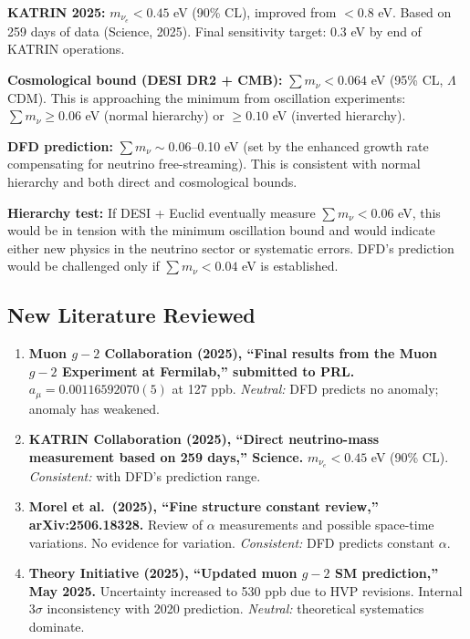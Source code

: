 \documentclass[11pt]{article}
\newcommand{\LCDM}{$\Lambda$CDM}
\begin{document}
\textbf{KATRIN 2025:} $m_{\nu_e} < 0.45$ eV (90\% CL), improved from
$< 0.8$ eV. Based on 259 days of data (Science, 2025). Final sensitivity
target: 0.3 eV by end of KATRIN operations.

\textbf{Cosmological bound (DESI DR2 + CMB):} $\sum m_\nu < 0.064$ eV
(95\% CL, \LCDM). This is approaching the minimum from oscillation
experiments: $\sum m_\nu \geq 0.06$ eV (normal hierarchy) or
$\geq 0.10$ eV (inverted hierarchy).

\textbf{DFD prediction:} $\sum m_\nu \sim 0.06$--0.10 eV (set by the
enhanced growth rate compensating for neutrino free-streaming). This
is consistent with normal hierarchy and both direct and cosmological
bounds.

\textbf{Hierarchy test:} If DESI + Euclid eventually measure
$\sum m_\nu < 0.06$ eV, this would be in tension with the minimum
oscillation bound and would indicate either new physics in the neutrino
sector or systematic errors. DFD's prediction would be challenged only
if $\sum m_\nu < 0.04$ eV is established.

\subsection{New Literature Reviewed}

\begin{tcolorbox}[colback=green!5!white, colframe=green!50!black,
  title=\textbf{Agent 13: NEW LITERATURE REVIEWED}]

\begin{enumerate}

\item \textbf{Muon $g-2$ Collaboration (2025), ``Final results from
  the Muon $g-2$ Experiment at Fermilab,'' submitted to PRL.}
  $a_\mu = 0.00116592070(5)$ at 127 ppb. \emph{Neutral:} DFD predicts
  no anomaly; anomaly has weakened.

\item \textbf{KATRIN Collaboration (2025), ``Direct neutrino-mass
  measurement based on 259 days,'' Science.}
  $m_{\nu_e} < 0.45$ eV (90\% CL). \emph{Consistent:} with DFD's
  prediction range.

\item \textbf{Morel et al.\ (2025), ``Fine structure constant review,''
  arXiv:2506.18328.}
  Review of $\alpha$ measurements and possible space-time variations.
  No evidence for variation. \emph{Consistent:} DFD predicts constant
  $\alpha$.

\item \textbf{Theory Initiative (2025), ``Updated muon $g-2$ SM
  prediction,'' May 2025.}
  Uncertainty increased to 530 ppb due to HVP revisions. Internal
  $3\sigma$ inconsistency with 2020 prediction. \emph{Neutral:}
  theoretical systematics dominate.

\end{enumerate}
\end{tcolorbox}
\end{document}
